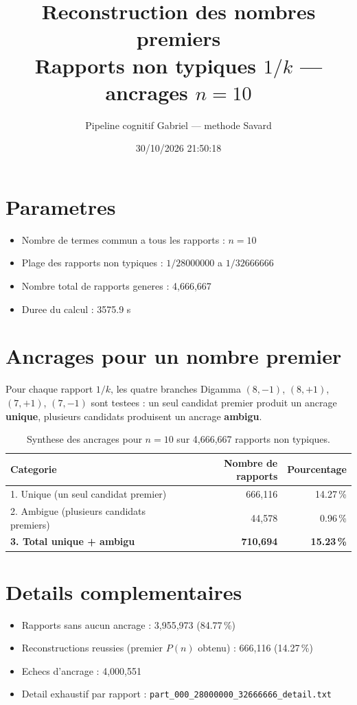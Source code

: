 \documentclass[12pt]{article}
\title{Reconstruction des nombres premiers\\Rapports non typiques $1/k$ --- ancrages $n=10$
}
\author{Pipeline cognitif Gabriel --- methode Savard}
\date{30/10/2026 21:50:18}
\begin{document}
\maketitle

\section*{Parametres}
\begin{itemize}
\item Nombre de termes commun a tous les rapports : $n=10$
\item Plage des rapports non typiques : $1/28000000$ a $1/32666666$
\item Nombre total de rapports generes : 4,666,667
\item Duree du calcul : 3575.9 s
\end{itemize}

\section*{Ancrages pour un nombre premier}

Pour chaque rapport $1/k$, les quatre branches Digamma $(8,-1)$, $(8,+1)$, $(7,+1)$, $(7,-1)$ sont testees : un seul candidat premier produit un ancrage \textbf{unique}, plusieurs candidats produisent un ancrage \textbf{ambigu}.

\begin{table}[h!]
\centering
\caption{Synthese des ancrages pour $n=10$ sur 4,666,667 rapports non typiques.}
\begin{tabular}{lrr}
\toprule
\textbf{Categorie} & \textbf{Nombre de rapports} & \textbf{Pourcentage} \\
\midrule
1. Unique (un seul candidat premier) & 666,116 & 14.27\,\% \\
2. Ambigue (plusieurs candidats premiers) & 44,578 & 0.96\,\% \\
\midrule
\textbf{3. Total unique + ambigu} & \textbf{710,694} & \textbf{15.23\,\%} \\
\bottomrule
\end{tabular}
\end{table}

\section*{Details complementaires}
\begin{itemize}
\item Rapports sans aucun ancrage : 3,955,973 (84.77\,\%)
\item Reconstructions reussies (premier $P(n)$ obtenu) : 666,116 (14.27\,\%)
\item Echecs d'ancrage : 4,000,551
\item Detail exhaustif par rapport : \texttt{part_000_28000000_32666666_detail.txt}
\end{itemize}
\end{document}
